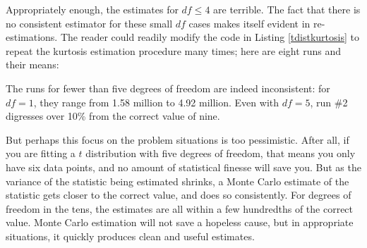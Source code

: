 Appropriately enough, the estimates for $df\leq 4$ are terrible.  
The fact that there is no consistent estimator for these small 
$df$ cases makes itself evident in re-estimations. The reader could readily
modify the code in Listing \ref{tdistkurtosis} to repeat the kurtosis estimation
procedure many times; here are eight runs and their means:

\vspace{\baselineskip}
\iftwocol\hspace{-8.0cm} 
\else\hspace{-1.4cm} \fi
{}
\vspace{\baselineskip}

The runs for fewer than five degrees of freedom are indeed inconsistent:
for $df = 1$, they range from 1.58 million to 4.92 million. Even with
$df = 5$, run \#2 digresses over 10\% from the correct value of nine.

But perhaps this focus on the problem situations is too pessimistic.
After all, if you are fitting a $t$ distribution with five degrees
of freedom, that means you only have six data points, and no amount of
statistical finesse will save you. But as the variance of the statistic being
estimated shrinks, a Monte Carlo estimate of the statistic gets closer to
the correct value, and does so consistently. For degrees of freedom in the
tens, the estimates are all within a few hundredths of the correct value.
Monte Carlo estimation will not save a hopeless cause, but in
appropriate situations, it quickly produces clean and useful estimates.

